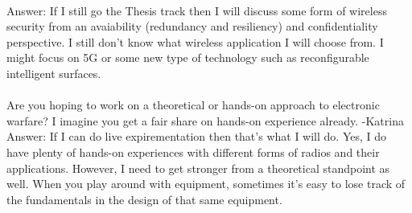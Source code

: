\paragraph{}
Answer: If I still go the Thesis track then I will discuss some form of wireless security from an avaiability (redundancy and resiliency) and confidentiality perspective.  I still don't know what wireless application I will choose from.  I might focus on 5G or some new type of technology such as reconfigurable intelligent surfaces. 
\paragraph{}
Are you hoping to work on a theoretical or hands-on approach to electronic warfare? I imagine you get a fair share on hands-on experience already. -Katrina
Answer: If I can do live expirementation then that's what I will do.  Yes, I do have plenty of hands-on experiences with different forms of radios and their applications.  However, I need to get stronger from a theoretical standpoint as well.  When you play around with equipment, sometimes it's easy to lose track of the fundamentals in the design of that same equipment.

%
